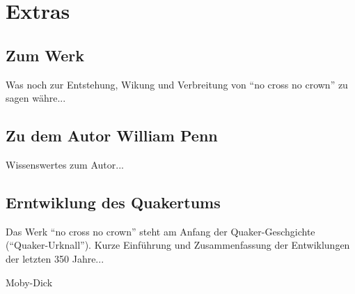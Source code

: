 
\part{Extras}


\chapter{Zum Werk}
Was noch zur Entstehung, Wikung und Verbreitung von "`no cross no crown"' zu sagen währe...

\chapter{Zu dem Autor William Penn}
Wissenswertes zum Autor...

\chapter{Erntwiklung des Quakertums}
Das Werk "`no cross no crown"' steht am Anfang der Quaker-Geschgichte ("`Quaker-Urknall"'). Kurze Einführung und Zusammenfassung der Entwiklungen der letzten 350 Jahre...

Moby-Dick